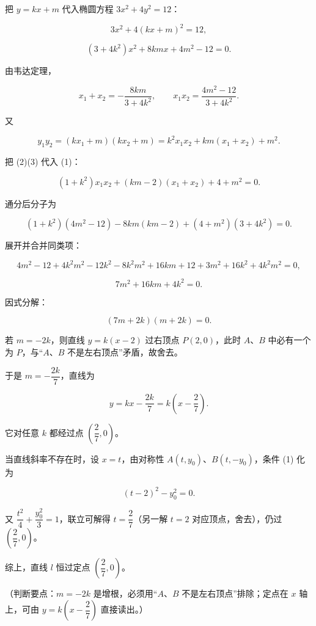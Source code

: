 \begin{answer}
把 $y=kx+m$ 代入椭圆方程 $3x^2+4y^2=12$：

\nopagebreak[4]
\[3x^2+4(kx+m)^2=12,\]

\nopagebreak[4]
\[(3+4k^2)x^2+8kmx+4m^2-12=0.\]

由韦达定理，

\nopagebreak[4]
\[x_1+x_2=-\frac{8km}{3+4k^2},\qquad x_1x_2=\frac{4m^2-12}{3+4k^2}. \tag{2}\]

又

\nopagebreak[4]
\[y_1y_2=(kx_1+m)(kx_2+m)=k^2x_1x_2+km(x_1+x_2)+m^2. \tag{3}\]

把 (2)(3) 代入 (1)：

\nopagebreak[4]
\[(1+k^2)x_1x_2+(km-2)(x_1+x_2)+4+m^2=0.\]

通分后分子为

\nopagebreak[4]
\[(1+k^2)(4m^2-12)-8km(km-2)+(4+m^2)(3+4k^2)=0.\]

展开并合并同类项：

\nopagebreak[4]
\[4m^2-12+4k^2m^2-12k^2-8k^2m^2+16km+12+3m^2+16k^2+4k^2m^2=0,\]

\nopagebreak[4]
\[7m^2+16km+4k^2=0.\]

因式分解：

\nopagebreak[4]
\[(7m+2k)(m+2k)=0.\]

若 $m=-2k$，则直线 $y=k(x-2)$ 过右顶点 $P(2,0)$，此时 $A$、$B$ 中必有一个为 $P$，与“$A$、$B$ 不是左右顶点”矛盾，故舍去。

于是 $m=-\dfrac{2k}{7}$，直线为

\nopagebreak[4]
\[y=kx-\frac{2k}{7}=k\left(x-\frac27\right).\]

它对任意 $k$ 都经过点 $\left(\dfrac27,0\right)$。

当直线斜率不存在时，设 $x=t$，由对称性 $A(t,y_0)$、$B(t,-y_0)$，条件 (1) 化为

\nopagebreak[4]
\[(t-2)^2-y_0^2=0.\]

又 $\dfrac{t^2}{4}+\dfrac{y_0^2}{3}=1$，联立可解得 $t=\dfrac27$（另一解 $t=2$ 对应顶点，舍去），仍过 $\left(\dfrac27,0\right)$。

综上，直线 $l$ 恒过定点 $\left(\dfrac27,0\right)$。

（判断要点：$m=-2k$ 是增根，必须用“$A$、$B$ 不是左右顶点”排除；定点在 $x$ 轴上，可由 $y=k\left(x-\dfrac27\right)$ 直接读出。）


\end{answer}
